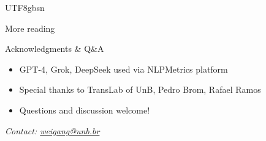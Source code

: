 \documentclass{beamer}
\begin{document}
\begin{CJK*}{UTF8}{gbsn}
\begin{frame}{More reading}
\begin{itemize}
\end{itemize}
\end{frame}

\begin{frame}{Acknowledgments \& Q\&A}
\begin{itemize}
    \item GPT-4, Grok, DeepSeek used via NLPMetrics platform
    \item Special thanks to TransLab of UnB, Pedro Brom, Rafael Ramos
    \item Questions and discussion welcome!
\end{itemize}
\vspace{0.5cm}
\centering
\textit{Contact: \underline{weigang@unb.br}}
\end{frame}

\end{CJK*}
\end{document}
